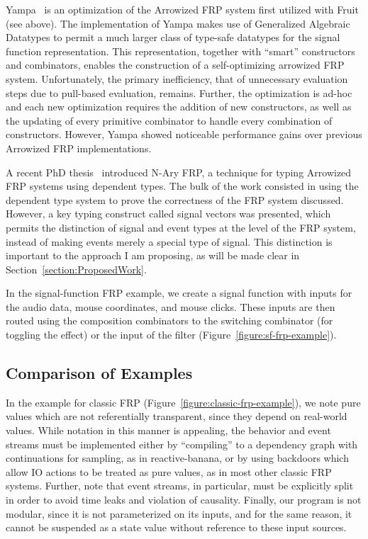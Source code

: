 Yampa~\cite{Nilsson2005} is an optimization of the Arrowized FRP system first utilized with Fruit (see above). The implementation of Yampa makes use of Generalized Algebraic Datatypes to permit a much larger class of type-safe datatypes for the signal function representation. This representation, together with ``smart''
constructors and combinators, enables the construction of a self-optimizing arrowized FRP system. Unfortunately, the primary inefficiency, that of unnecessary evaluation
steps due to pull-based evaluation, remains. Further, the optimization is ad-hoc and each new optimization requires the addition of new constructors, as well
as the updating of every primitive combinator to handle every combination of constructors. However, Yampa showed noticeable performance gains over previous Arrowized FRP implementations.

A recent PhD thesis~\cite{Sculthorpe2011} introduced N-Ary FRP, a technique for typing Arrowized FRP systems using dependent types. The bulk of the work consisted
in using the dependent type system to prove the correctness of the FRP system discussed. However, a key typing construct called signal vectors was presented,
which permits the distinction of signal and event types at the level of the FRP system, instead of making events merely a special type of signal. This distinction
is important to the approach I am proposing, as will be made clear in Section~\ref{section:ProposedWork}.

In the signal-function FRP example, we create a signal function with inputs for the audio data, mouse coordinates, and mouse clicks. These inputs are then routed
using the composition combinators to the switching combinator (for toggling the effect) or the input of the filter (Figure~\ref{figure:sf-frp-example}).

\subsection{Comparison of Examples}
\label{subsection:comparison_of_examples}

In the example for classic FRP (Figure~\ref{figure:classic-frp-example}), we note pure values which are not referentially transparent,
since they depend on real-world values. While notation in this manner is appealing, the behavior and event streams must be implemented either
by ``compiling'' to a dependency graph with continuations for sampling, as in reactive-banana, or by using backdoors which allow
IO actions to be treated as pure values, as in most other classic FRP systems. Further, note that event streams, in particular, must be 
explicitly split in order to avoid time leaks and violation of causality. Finally, our program is not modular, since it is not parameterized on
its inputs, and for the same reason, it cannot be suspended as a state value without reference to these input sources.

